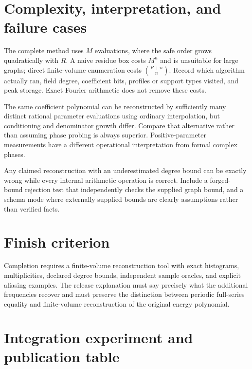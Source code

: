 \documentclass[
  11pt,
  a4paper,
]{report}
\begin{document}
\hypertarget{complexity-interpretation-and-failure-cases}{%
\section{Complexity, interpretation, and failure
cases}\label{complexity-interpretation-and-failure-cases}}

The complete method uses \(M\) evaluations, where the safe order grows
quadratically with \(R\). A naive residue box costs \(M^n\) and is
unsuitable for large graphs; direct finite-volume enumeration costs
\(\binom{R+n}{n}\). Record which algorithm actually ran, field degree,
coefficient bits, profiles or support types visited, and peak storage.
Exact Fourier arithmetic does not remove these costs.

The same coefficient polynomial can be reconstructed by sufficiently
many distinct rational parameter evaluations using ordinary
interpolation, but conditioning and denominator growth differ. Compare
that alternative rather than assuming phase probing is always superior.
Positive-parameter measurements have a different operational
interpretation from formal complex phases.

Any claimed reconstruction with an underestimated degree bound can be
exactly wrong while every internal arithmetic operation is correct.
Include a forged-bound rejection test that independently checks the
supplied graph bound, and a schema mode where externally supplied bounds
are clearly assumptions rather than verified facts.

\hypertarget{finish-criterion-2}{%
\section{Finish criterion}\label{finish-criterion-2}}

Completion requires a finite-volume reconstruction tool with exact
histograms, multiplicities, declared degree bounds, independent sample
oracles, and explicit aliasing examples. The release explanation must
say precisely what the additional frequencies recover and must preserve
the distinction between periodic full-series equality and finite-volume
reconstruction of the original energy polynomial.

\hypertarget{integration-experiment-and-publication-table}{%
\section{Integration experiment and publication
table}\label{integration-experiment-and-publication-table}}
\end{document}
